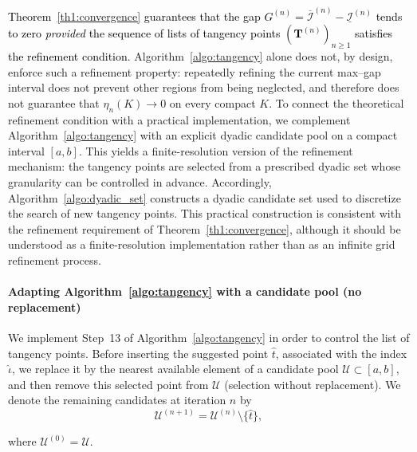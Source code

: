 \documentclass[review]{elsarticle}
\newcommand{\cblue}{\textcolor{black}}
\begin{document}
\cblue{
Theorem~\ref{th1:convergence} guarantees that the gap
$G^{(n)}=\overline{\mathcal I}^{(n)}-\underline{\mathcal I}^{(n)}$ tends to zero \emph{provided} the sequence of lists of tangency points $(\mathbf T^{(n)})_{n\ge 1}$ satisfies the refinement condition.%
}
Algorithm~\ref{algo:tangency} alone does not, by design, enforce such a refinement property: repeatedly refining the current max--gap interval does not prevent other regions from being neglected, and therefore does not guarantee that $\eta_n(K)\to 0$ on every compact $K$.
To connect the theoretical refinement condition with a practical implementation, we complement Algorithm~\ref{algo:tangency} with an explicit dyadic candidate pool on a compact interval $[a,b]$. This yields a finite-resolution version of the refinement mechanism: the tangency points are selected from a prescribed dyadic set whose granularity can be controlled in advance.
Accordingly, Algorithm~\ref{algo:dyadic_set} constructs a dyadic candidate set used to discretize the search of new tangency points. This practical construction is consistent with the refinement requirement of Theorem~\ref{th1:convergence}, although it should be understood as a finite-resolution implementation rather than as an infinite grid refinement process.

\paragraph{Adapting Algorithm~\ref{algo:tangency} with a candidate pool (no replacement)}
We implement Step~13 of Algorithm~\ref{algo:tangency} in order to control the list of tangency points. Before inserting the suggested point $\hat t$, associated with the index $\hat\iota$, we replace it by the nearest available element of a candidate pool $\mathcal U\subset [a,b]$, and then remove this selected point from $\mathcal U$ (selection without replacement). We denote the remaining candidates at iteration $n$ by
$$
\mathcal U^{(n+1)}=\mathcal U^{(n)}\setminus\{\hat t\},
$$

where $\mathcal U^{(0)}=\mathcal U$.
\end{document}
